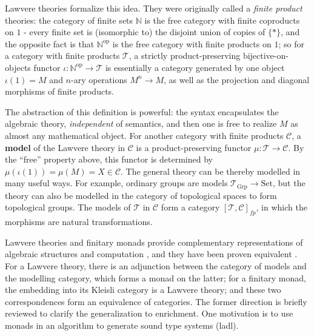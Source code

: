 \documentclass[a4paper,UKenglish]{article}
\newcommand{\Set}{\mathrm{Set}}
\newcommand{\Grp}{\mathrm{Grp}}
\newcommand{\op}{\mathrm{op}}
\newcommand{\NN}{\mathbb{N}}
\newcommand{\C}{\mathscr{C}}
\newcommand{\T}{\mathscr{T}}
\begin{document}
Lawvere theories formalize this idea. They were originally called a \textit{finite product} theories: the category of finite sets $\NN$ is the free category with finite coproducts on $1$ - every finite set is (isomorphic to) the disjoint union of copies of $\{*\}$, and the opposite fact is that $\NN^\op$ is the free category with finite products on $1$; so for a category with finite products $\T$, a strictly product-preserving bijective-on-objects functor $\iota:\NN^\op \to \T$ is essentially a category generated by one object $\iota(1) = M$ and $n$-ary operations $M^n \to M$, as well as the projection and diagonal morphisms of finite products.

The abstraction of this definition is powerful: the syntax encapsulates the algebraic theory, \textit{independent} of semantics, and then one is free to realize $M$ as almost any mathematical object. For another category with finite products $\C$, a \textbf{model} of the Lawvere theory in $\C$ is a product-preserving functor $\mu: \T \to \C$. By the ``free'' property above, this functor is determined by $\mu(\iota(1)) = \mu(M) = X \in \C$. The general theory can be thereby modelled in many useful ways. For example, ordinary groups are models $\T_\Grp \to \Set$, but the theory can also be modelled in the category of topological spaces to form topological groups. The models of $\T$ in $\C$ form a category $[\T,\C]_{fp}$, in which the morphisms are natural transformations. 

Lawvere theories and finitary monads provide complementary representations of algebraic structures and computation \cite{ltam}, and they have been proven equivalent \cite{linton}. For a Lawvere theory, there is an adjunction between the category of models and the modelling category, which forms a monad on the latter; for a finitary monad, the embedding into its Kleisli category is a Lawvere theory; and these two correspondences form an equivalence of categories. The former direction is briefly reviewed to clarify the generalization to enrichment. One motivation is to use monads in an algorithm to generate sound type systems (ladl).
\end{document}
